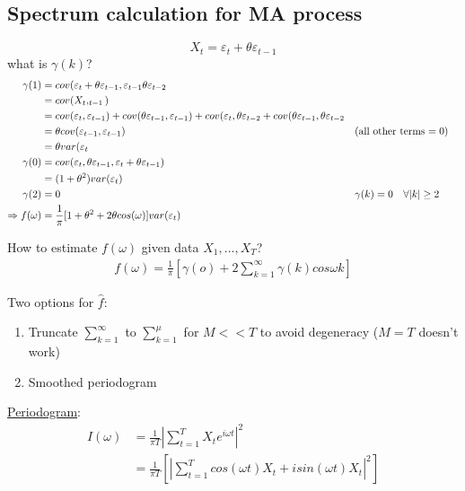 \subsection{Spectrum calculation for MA process}
\[X_t=\varepsilon_t + \theta \varepsilon_{t-1}\]
what is $\gamma(k)$?
\begin{align*}
    \gamma(1)&=cov(\varepsilon_t+\theta \varepsilon_{t-1}, \varepsilon_{t-1} \theta \varepsilon_{t-2} \\
    &= cov(X_t, _{t-1})\\
    &= cov(\varepsilon_{t}, \varepsilon_{t-1})+cov(\theta \varepsilon_{t-1}, \varepsilon_{t-1}) + cov(\varepsilon_{t}, \theta \varepsilon_{t-2}+cov(\theta \varepsilon_{t-1}, \theta \varepsilon_{t-2}\\
    &= \theta cov(\varepsilon_{t-1},\varepsilon_{t-1}) &&\text{(all other terms $=0$)}\\
    &= \theta var(\varepsilon_{t}\\
    \gamma(0)&= cov(\varepsilon_{t}, \theta \varepsilon_{t-1}, \varepsilon_{t} + \theta \varepsilon_{t-1}) \\
    &= (1+\theta^2)var(\varepsilon_{t}) \\
    \gamma(2)&=0 &&{\gamma(k)=0 \text{\quad} \forall |k|\geq 2 } \\
    \Rightarrow f(\omega) &= \frac{1}{\pi} [ 1 + \theta^2 + 2 \theta cos(\omega) ]var(\varepsilon_t)
\end{align*}

How to estimate $f(\omega)$ given data $X_1,...,X_T$?
\begin{align*}
    f(\omega) =\frac{1}{\pi} [ \gamma(o) + 2\sum_{k=1}^\infty \gamma(k) cos \omega k] 
\end{align*}

Two options for $\hat{f}$: 
\begin{enumerate}
    \item Truncate $\sum_{k=1}^\infty$ to $\sum_{k=1}^\mu$ for $M<<T$ to avoid degeneracy ($M=T$ doesn't work)
    \item Smoothed periodogram
\end{enumerate}

\underline{Periodogram}:
\begin{align*}
    I(\omega) &= \frac{1}{\pi T} \left | \sum_{t=1}^T X_t e^{i\omega t}\right |^2\\
    &= \frac{1}{\pi T} \left[ \left| \sum_{t=1}^T cos(\omega t)X_t + i sin(\omega t)X_t \right |^2 \right]
\end{align*}


